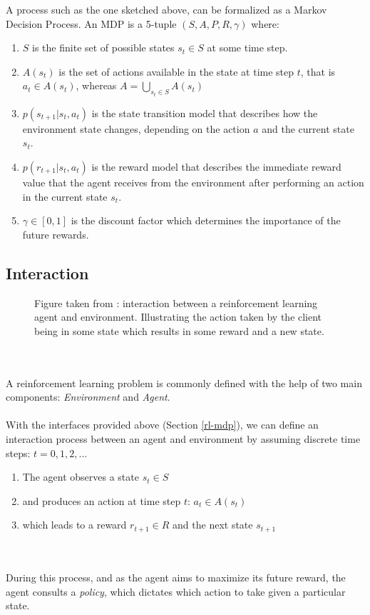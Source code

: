 A process such as the one sketched above, can be formalized as a Markov Decision Process.
An MDP is a 5-tuple $(S, A, P, R, \gamma)$ where:
\begin{enumerate}
    \item $S$ is the finite set of possible states $s_t \in S$ at some time step.
    \item $A(s_t)$ is the set of actions available in the state at time step $t$, that is $a_t \in A(s_t)$, whereas $A=\bigcup_{s_t \in S} A(s_t)$
    \item $p(s_{t+1} | s_t, a_t)$ is the state transition model that describes how the environment state changes, depending on the action $a$ and the current state $s_t$.
    \item $p(r_{t+1} | s_t, a_t)$ is the reward model that describes the immediate reward value that the agent receives from the environment after performing an action in the current state $s_t$.
    \item $\gamma \in [0,1]$ is the discount factor which determines the importance of the future rewards.
\end{enumerate}

\subsection{Interaction}

\begin{figure}[H]
    \centering
    \caption{Figure taken from \cite{rl-demystified}: interaction between a reinforcement learning agent and environment. Illustrating the action taken by the client being in some state which results in some reward and a new state.}
    \label{fit:rl-overview}
\end{figure}
\\
\\
A reinforcement learning problem is commonly defined with the help of two main components: \textit{Environment} and \textit{Agent}.
\\
\\
With the interfaces provided above (Section \ref{rl-mdp}), we can define an interaction process between an agent and environment by assuming discrete time steps: $t=0, 1, 2, ...$

\begin{enumerate}
    \item The agent observes a state $s_t \in S$
    \item and produces an action at time step $t$: $a_t \in A(s_t)$
    \item which leads to a reward $r_{t+1} \in R$ and the next state $s_{t+1}$
\end{enumerate}
\\
\\
During this process, and as the agent aims to maximize its future reward, the agent consults a \textit{policy}, which dictates which action to take given a particular state.

